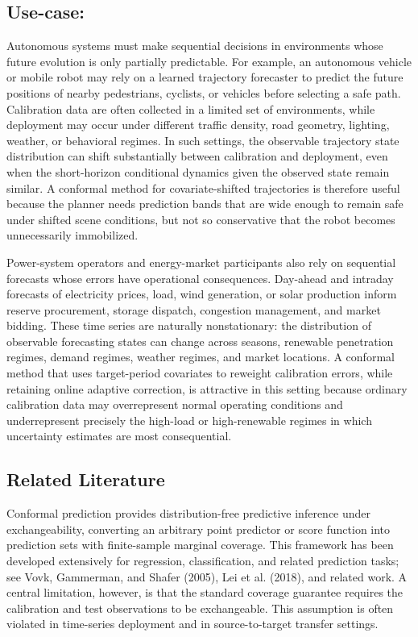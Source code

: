 \documentclass{article}
\numberwithin{equation}{section}
\begin{document}
\subsection{Use-case:}
Autonomous systems must make sequential decisions in environments whose future evolution is only partially predictable. For example, an autonomous vehicle or mobile robot may rely on a learned trajectory forecaster to predict the future positions of nearby pedestrians, cyclists, or vehicles before selecting a safe path. Calibration data are often collected in a limited set of environments, while deployment may occur under different traffic density, road geometry, lighting, weather, or behavioral regimes. In such settings, the observable trajectory state distribution can shift substantially between calibration and deployment, even when the short-horizon conditional dynamics given the observed state remain similar. A conformal method for covariate-shifted trajectories is therefore useful because the planner needs prediction bands that are wide enough to remain safe under shifted scene conditions, but not so conservative that the robot becomes unnecessarily immobilized.

Power-system operators and energy-market participants also rely on sequential forecasts whose errors have operational consequences. Day-ahead and intraday forecasts of electricity prices, load, wind generation, or solar production inform reserve procurement, storage dispatch, congestion management, and market bidding. These time series are naturally nonstationary: the distribution of observable forecasting states can change across seasons, renewable penetration regimes, demand regimes, weather regimes, and market locations. A conformal method that uses target-period covariates to reweight calibration errors, while retaining online adaptive correction, is attractive in this setting because ordinary calibration data may overrepresent normal operating conditions and underrepresent precisely the high-load or high-renewable regimes in which uncertainty estimates are most consequential.

\subsection{Related Literature}

Conformal prediction provides distribution-free predictive inference under
exchangeability, converting an arbitrary point predictor or score function into
prediction sets with finite-sample marginal coverage. This framework has been
developed extensively for regression, classification, and related prediction
tasks; see Vovk, Gammerman, and Shafer (2005), Lei et al. (2018), and related
work. A central limitation, however, is that the standard coverage guarantee
requires the calibration and test observations to be exchangeable. This
assumption is often violated in time-series deployment and in source-to-target
transfer settings.
\end{document}
